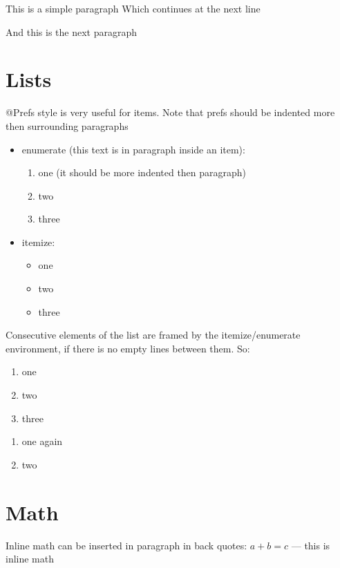 \documentclass[12pt,a4paper,oneside]{article}
\begin{document}

This is a simple paragraph
Which continues at the next line

And this is the next paragraph

\section{Lists}
@Prefs style is very useful for items. 
Note that prefs should be indented more then surrounding paragraphs
\begin{itemize}
\item enumerate (this text is in paragraph inside an item):
\begin{enumerate}
\item one (it should be more indented then paragraph)
\item two
\item three
\end{enumerate}
\item itemize:
\begin{itemize}
\item one
\item two
\item three
\end{itemize}
\end{itemize}

Consecutive elements of the list are framed by the itemize/enumerate environment,
if there is no empty lines between them. So:
\begin{enumerate}
\item one
\item two
\item three
\end{enumerate}

\begin{enumerate}
\item one again
\item two
\end{enumerate}

\section{Math}
Inline math can be inserted in paragraph in back quotes: $a + b = c$ 
--- this is inline math
\end{document}

